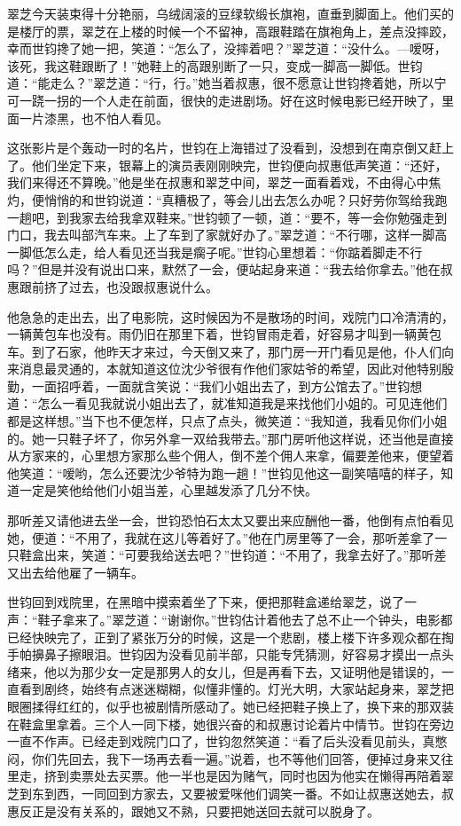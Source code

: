 \par 翠芝今天装束得十分艳丽，乌绒阔滚的豆绿软缎长旗袍，直垂到脚面上。他们买的是楼厅的票，翠芝在上楼的时候一个不留神，高跟鞋踏在旗袍角上，差点没摔跤，幸而世钧搀了她一把，笑道：“怎么了，没摔着吧？”翠芝道：“没什么。—嗳呀，该死，我这鞋跟断了！”她鞋上的高跟别断了一只，变成一脚高一脚低。世钧道：“能走么？”翠芝道：“行，行。”她当着叔惠，很不愿意让世钧搀着她，所以宁可一跷一拐的一个人走在前面，很快的走进剧场。好在这时候电影已经开映了，里面一片漆黑，也不怕人看见。
\par 这张影片是个轰动一时的名片，世钧在上海错过了没看到，没想到在南京倒又赶上了。他们坐定下来，银幕上的演员表刚刚映完，世钧便向叔惠低声笑道：“还好，我们来得还不算晚。”他是坐在叔惠和翠芝中间，翠芝一面看着戏，不由得心中焦灼，便悄悄的和世钧说道：“真糟极了，等会儿出去怎么办呢？只好劳你驾给我跑一趟吧，到我家去给我拿双鞋来。”世钧顿了一顿，道：“要不，等一会你勉强走到门口，我去叫部汽车来。上了车到了家就好办了。”翠芝道：“不行哪，这样一脚高一脚低怎么走，给人看见还当我是瘸子呢。”世钧心里想着：“你踮着脚走不行吗？”但是并没有说出口来，默然了一会，便站起身来道：“我去给你拿去。”他在叔惠跟前挤了过去，也没跟叔惠说什么。
\par 他急急的走出去，出了电影院，这时候因为不是散场的时间，戏院门口冷清清的，一辆黄包车也没有。雨仍旧在那里下着，世钧冒雨走着，好容易才叫到一辆黄包车。到了石家，他昨天才来过，今天倒又来了，那门房一开门看见是他，仆人们向来消息最灵通的，本就知道这位沈少爷很有作他们家姑爷的希望，因此对他特别殷勤，一面招呼着，一面就含笑说：“我们小姐出去了，到方公馆去了。”世钧想道：“怎么一看见我就说小姐出去了，就准知道我是来找他们小姐的。可见连他们都是这样想。”当下也不便怎样，只点了点头，微笑道：“我知道，我看见你们小姐的。她一只鞋子坏了，你另外拿一双给我带去。”那门房听他这样说，还当他是直接从方家来的，心里想方家那么些个佣人，倒不差个佣人来拿，偏要差他来，便望着他笑道：“嗳哟，怎么还要沈少爷特为跑一趟！”世钧见他这一副笑嘻嘻的样子，知道一定是笑他给他们小姐当差，心里越发添了几分不快。
\par 那听差又请他进去坐一会，世钧恐怕石太太又要出来应酬他一番，他倒有点怕看见她，便道：“不用了，我就在这儿等着好了。”他在门房里等了一会，那听差拿了一只鞋盒出来，笑道：“可要我给送去吧？”世钧道：“不用了，我拿去好了。”那听差又出去给他雇了一辆车。
\par 世钧回到戏院里，在黑暗中摸索着坐了下来，便把那鞋盒递给翠芝，说了一声：“鞋子拿来了。”翠芝道：“谢谢你。”世钧估计着他去了总不止一个钟头，电影都已经快映完了，正到了紧张万分的时候，这是一个悲剧，楼上楼下许多观众都在掏手帕擤鼻子擦眼泪。世钧因为没看见前半部，只能专凭猜测，好容易才摸出一点头绪来，他以为那少女一定是那男人的女儿，但是再看下去，又证明他是错误的，一直看到剧终，始终有点迷迷糊糊，似懂非懂的。灯光大明，大家站起身来，翠芝把眼圈揉得红红的，似乎也被剧情所感动了。她已经把鞋子换上了，换下来的那双装在鞋盒里拿着。三个人一同下楼，她很兴奋的和叔惠讨论着片中情节。世钧在旁边一直不作声。已经走到戏院门口了，世钧忽然笑道：“看了后头没看见前头，真憋闷，你们先回去，我下一场再去看一遍。”说着，也不等他们回答，便掉过身来又往里走，挤到卖票处去买票。他一半也是因为赌气，同时也因为他实在懒得再陪着翠芝到东到西，一同回到方家去，又要被爱咪他们调笑一番。不如让叔惠送她去，叔惠反正是没有关系的，跟她又不熟，只要把她送回去就可以脱身了。
